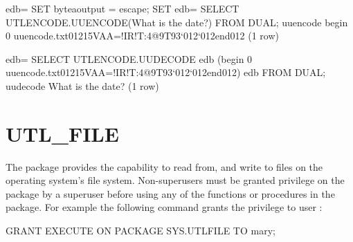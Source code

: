 \documentclass[letterpaper,10pt,english,openany,oneside]{sphinxmanual}
\begin{document}
%
\begin{sphinxVerbatim}[commandchars=\\\{\}]
edb=\PYGZsh{} SET bytea\PYGZus{}output = escape;
SET
edb=\PYGZsh{} SELECT UTL\PYGZus{}ENCODE.UUENCODE(\PYGZsq{}What is the date?\PYGZsq{}) FROM DUAL;
                              uuencode
\PYGZhy{}\PYGZhy{}\PYGZhy{}\PYGZhy{}\PYGZhy{}\PYGZhy{}\PYGZhy{}\PYGZhy{}\PYGZhy{}\PYGZhy{}\PYGZhy{}\PYGZhy{}\PYGZhy{}\PYGZhy{}\PYGZhy{}\PYGZhy{}\PYGZhy{}\PYGZhy{}\PYGZhy{}\PYGZhy{}\PYGZhy{}\PYGZhy{}\PYGZhy{}\PYGZhy{}\PYGZhy{}\PYGZhy{}\PYGZhy{}\PYGZhy{}\PYGZhy{}\PYGZhy{}\PYGZhy{}\PYGZhy{}\PYGZhy{}\PYGZhy{}\PYGZhy{}\PYGZhy{}\PYGZhy{}\PYGZhy{}\PYGZhy{}\PYGZhy{}\PYGZhy{}\PYGZhy{}\PYGZhy{}\PYGZhy{}\PYGZhy{}\PYGZhy{}\PYGZhy{}\PYGZhy{}\PYGZhy{}\PYGZhy{}\PYGZhy{}\PYGZhy{}\PYGZhy{}\PYGZhy{}\PYGZhy{}\PYGZhy{}\PYGZhy{}\PYGZhy{}\PYGZhy{}\PYGZhy{}\PYGZhy{}\PYGZhy{}\PYGZhy{}\PYGZhy{}\PYGZhy{}\PYGZhy{}\PYGZhy{}\PYGZhy{}
 begin 0 uuencode.txt\PYGZbs{}01215VAA=\PYGZdq{}!I\PYGZlt{}R!T:\PYGZam{}4@9\PYGZam{}\PYGZpc{}T93\PYGZbs{}\PYGZbs{}{}`\PYGZbs{}012{}`\PYGZbs{}012end\PYGZbs{}012
(1 row)

edb=\PYGZsh{} SELECT UTL\PYGZus{}ENCODE.UUDECODE
edb\PYGZhy{}\PYGZsh{} (\PYGZsq{}begin 0 uuencode.txt\PYGZbs{}01215VAA=\PYGZdq{}!I\PYGZlt{}R!T:\PYGZam{}4@9\PYGZam{}\PYGZpc{}T93\PYGZbs{}\PYGZbs{}{}`\PYGZbs{}012{}`\PYGZbs{}012end\PYGZbs{}012\PYGZsq{})
edb\PYGZhy{}\PYGZsh{} FROM DUAL;
     uudecode
\PYGZhy{}\PYGZhy{}\PYGZhy{}\PYGZhy{}\PYGZhy{}\PYGZhy{}\PYGZhy{}\PYGZhy{}\PYGZhy{}\PYGZhy{}\PYGZhy{}\PYGZhy{}\PYGZhy{}\PYGZhy{}\PYGZhy{}\PYGZhy{}\PYGZhy{}\PYGZhy{}\PYGZhy{}
 What is the date?
(1 row)
\end{sphinxVerbatim}

\newpage


\section{UTL\_FILE}
\label{\detokenize{utl_file::doc}}\label{\detokenize{utl_file:utl-file}}
The  package provides the capability to read from, and write to
files on the operating system’s file system. Non-superusers must be
granted  privilege on the  package by a superuser before
using any of the functions or procedures in the package. For example the
following command grants the privilege to user :

%
\begin{sphinxVerbatim}[commandchars=\\\{\}]
GRANT EXECUTE ON PACKAGE SYS.UTL\PYGZus{}FILE TO mary;
\end{sphinxVerbatim}
\end{document}
